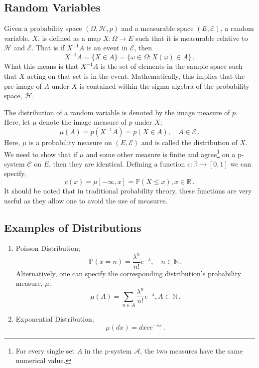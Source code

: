 \subsection{Random Variables}

Given a probability space $(\Omega, \mathcal{H}, p)$ and a measurable space $(E, \mathcal{E})$, a random variable, $X$, is defined as a map $X: \Omega \rightarrow E$ such that it is measurable relative to $\mathcal{H}$ and $\mathcal{E}$. That is if $X^{-1}A$ is an event in $\mathcal{E}$, then
\begin{equation}
	X^{-1}A = \{X \in A\} = \{\omega \in \Omega: X(\omega) \in A\}\,.
\end{equation}
What this means is that $X^{-1}A$ is the set of elements in the sample space such that $X$ acting on that set is in the event. Mathematically, this implies that the pre-image of $A$ under $X$ is contained within the sigma-algebra of the probability space, $\mathcal{H}$.

The distribution of a random variable is denoted by the image measure of $p$. Here, let $\mu$ denote the image measure of $p$ under $X$;
\begin{equation}
	\mu(A) = p(X^{-1}A) = p(X \in A), \quad A \in \mathcal{E}\,.
\end{equation}
Here, $\mu$ is a probability measure on $(E, \mathcal{E})$ and is called the distribution of $X$. We need to show that if $\mu$ and some other measure is finite and agree\footnote{For every single set $A$ in the p-system $\mathcal{A}$, the two measures have the same numerical value.} on a p-system $\mathcal{C}$ on $E$, then they are identical. Defining a function $c:\mathbb{R}\rightarrow [0,1]$ we can specify,
\begin{equation}
	c(x) = \mu[-\infty, x] = \mathbb{P}(X\leq x), x \in \mathbb{R}\,.
\end{equation}
It should be noted that in traditional probability theory, these functions are very useful as they allow one to avoid the use of measures. 

\subsection{Examples of Distributions}

\begin{enumerate}
	\item Poisson Distribution;
	\begin{equation}
		\mathbb{P}(x = n) = \frac{\lambda^n}{n!}e^{-\lambda}, \quad n \in \mathbb{N}\,.
	\end{equation}
	Alternatively, one can specify the corresponding distribution's probability measure, $\mu$.
	\begin{equation}
		\mu(A) = \sum_{n\in A}\frac{\lambda^n}{n!}e^{-\lambda}, A \subset \mathbb{N}\,.
	\end{equation}
	\item Exponential Distribution;
	\begin{equation}
		\mu(dx) =dx c e^{-cx}\,.
	\end{equation}
\end{enumerate}


